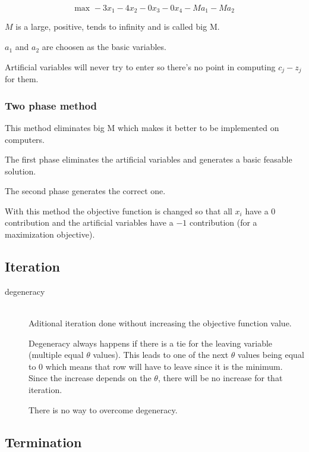 \documentclass[a4paper, 12pt]{article}
\begin{document}
\begin{equation*}
    \text{max } -3x_1 - 4x_2 - 0x_3 - 0x_4 - Ma_1 - Ma_2
\end{equation*}

$M$ is a large, positive, tends to infinity and is called big M.

$a_1$ and $a_2$ are choosen as the basic variables.

Artificial variables will never try to enter so there's no point in computing
$c_j-z_j$ for them.

\subsubsection{Two phase method}

This method eliminates big M which makes it better to be implemented on
computers.

The first phase eliminates the artificial variables and generates a basic
feasable solution.

The second phase generates the correct one.

With this method the objective function is changed so that all $x_i$ have a 0
contribution and the artificial variables have a $-1$ contribution (for a
maximization objective).

\subsection{Iteration}

\begin{description}

\item[degeneracy] \hfill \\
    Aditional iteration done without increasing the objective function value.
    
    Degeneracy always happens if there is a tie for the leaving variable
    (multiple equal $\theta$ values). This leads to one of the next $\theta$
    values being equal to 0 which means that row will have to leave since it is
    the minimum. Since the increase depends on the $\theta$, there will be no
    increase for that iteration.
    
    There is no way to overcome degeneracy.

\end{description}

\subsection{Termination}
\end{document}
